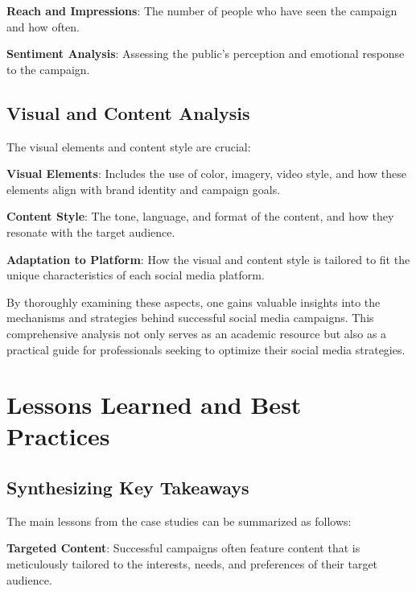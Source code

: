\documentclass[
]{book}
\begin{document}
\textbf{Reach and Impressions}: The number of people who have seen the campaign and how often.

\textbf{Sentiment Analysis}: Assessing the public's perception and emotional response to the campaign.

\hypertarget{visual-and-content-analysis}{%
\subsection{Visual and Content Analysis}\label{visual-and-content-analysis}}

The visual elements and content style are crucial:

\textbf{Visual Elements}: Includes the use of color, imagery, video style, and how these elements align with brand identity and campaign goals.

\textbf{Content Style}: The tone, language, and format of the content, and how they resonate with the target audience.

\textbf{Adaptation to Platform}: How the visual and content style is tailored to fit the unique characteristics of each social media platform.

By thoroughly examining these aspects, one gains valuable insights into the mechanisms and strategies behind successful social media campaigns. This comprehensive analysis not only serves as an academic resource but also as a practical guide for professionals seeking to optimize their social media strategies.

\hypertarget{lessons-learned-and-best-practices}{%
\section*{Lessons Learned and Best Practices}\label{lessons-learned-and-best-practices}}

\hypertarget{synthesizing-key-takeaways}{%
\subsection{Synthesizing Key Takeaways}\label{synthesizing-key-takeaways}}

The main lessons from the case studies can be summarized as follows:

\textbf{Targeted Content}: Successful campaigns often feature content that is meticulously tailored to the interests, needs, and preferences of their target audience.
\end{document}
